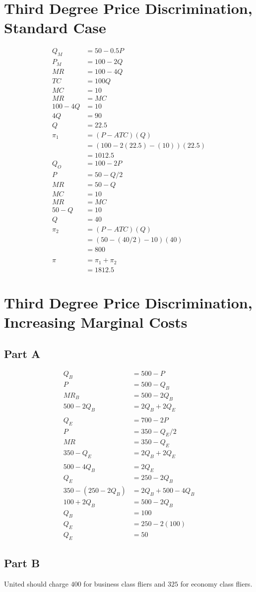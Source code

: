 \documentclass[8pt]{extarticle}
\begin{document}
{\section*{Third Degree Price Discrimination, Standard Case}%
  \begin{align*}
    Q_M &= 50 - 0.5P\\
    P_{M} &= 100-2Q\\
    MR &= 100-4Q\\
    TC &= 100Q\\
    MC &= 10\\
    MR &= MC\\
    100-4Q &= 10\\
    4Q &= 90\\
    Q &= 22.5\\
    \pi_1 &= (P-ATC)(Q)\\
        &= (100-2(22.5) - (10))(22.5)\\
        &= 1012.5
        \\
    Q_{O} &= 100-2P\\
    P &= 50-Q/2\\
    MR &= 50-Q\\
    MC &= 10\\
    MR &= MC\\
    50-Q &= 10\\
    Q &= 40\\
    \pi_2 &= (P-ATC)(Q)\\
          &= (50-(40/2)-10)(40)\\
          &= 800\\
          \\
    \pi &= \pi_1 + \pi_2\\
        &= \boxed{1812.5}
  \end{align*}
\section*{Third Degree Price Discrimination, Increasing Marginal Costs}%
\subsection*{Part A}%
  \begin{align*}
    Q_B &= 500-P\\
    P &= 500-Q_B\\
    MR_B &= 500-2Q_B\\
    500-2Q_B &= 2Q_B + 2Q_E\\
    \\
    Q_E &= 700-2P\\
    P &= 350-Q_E/2\\
    MR &= 350-Q_E\\
    350-Q_E &= 2Q_B + 2Q_E\\
    \\
    500-4Q_B &= 2Q_E\\
    Q_E &= 250-2Q_B\\
    350-(250-2Q_B) &= 2Q_B + 500-4Q_B\\
    100+2Q_B &= 500-2Q_B\\
    Q_B &= \boxed{100}\\
    Q_E &= 250-2(100)\\
    Q_E &= \boxed{50}
  \end{align*}
\subsection*{Part B}%
  United should charge $400$ for business class fliers and $325$ for economy class fliers. 

}
\end{document}
